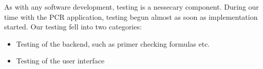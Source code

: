 %
%
%

As with any software development, testing is a nessecary component. During our time with the PCR application, testing begun
almost as soon as implementation started. Our testing fell into two categories: \\

\begin{itemize}
\item Testing of the backend, such as primer checking formulas etc.
\item Testing of the user interface
\end{itemize}




